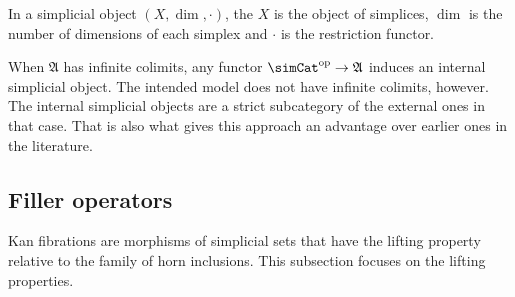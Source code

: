 \documentclass{tac}
\newcommand\hide[1]{}
\newcommand\dual{^{\mathrm{op}}}
\newcommand\s{^{\simCat\dual}}
\newcommand\ambient{\mathfrak A}
\begin{document}
In a simplicial object $(X,\dim,\cdot)$, the $X$ is the object of simplices, $\dim$ is the number of dimensions of each simplex and $\cdot$ is the restriction functor.

\begin{remark} When $\ambient$ has infinite colimits, any functor $\simCat\dual\to\ambient$ induces an internal simplicial object. The intended model does not have infinite colimits, however. The internal simplicial objects are a strict subcategory of the external ones in that case. That is also what gives this approach an advantage over earlier ones in the literature.%
\end{remark}

\hide{
\subsection{Families}
\begin{defin}
For each object $I$ of $\ambient$ the category $\ambient/I\s$ of simplicial objects in the slice $\ambient/I$ is an \emph{$I$-indexed families of simplicial objects}. 
\end{defin}

Is there anything to prove here?

Other thought: maybe treat the equivalence of $\ambient\s/J$ with $\ambient^{EJ}\s$ here, with $EJ$ the category of elements of the simplicial set $J$.

}

\subsection{Filler operators}
Kan fibrations are morphisms of simplicial sets that have the lifting property relative to the family of horn inclusions. This subsection focuses on the lifting properties.

\hide{
When dealing with projectives, the properties 'there is a lifting' and having a lifting operator coincide.

We just need to be careful about non projective simplicial objects--these newbies may have unexpected properties.

Check when being projective plays a role.
}
\end{document}
